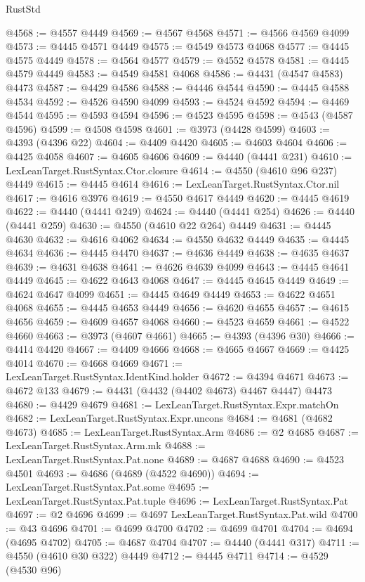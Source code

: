 \begin{lexlean}{RustStd}
\begin{coremodule}
@4568 := @4557 @4449
@4569 := @4567 @4568
@4571 := @4566 @4569 @4099
@4573 := @4445 @4571 @4449
@4575 := @4549 @4573 @4068
@4577 := @4445 @4575 @4449
@4578 := @4564 @4577
@4579 := @4552 @4578
@4581 := @4445 @4579 @4449
@4583 := @4549 @4581 @4068
@4586 := @4431 (@4547 @4583) @4473
@4587 := @4429 @4586
@4588 := @4446 @4544
@4590 := @4445 @4588 @4534
@4592 := @4526 @4590 @4099
@4593 := @4524 @4592
@4594 := @4469 @4544
@4595 := @4593 @4594
@4596 := @4523 @4595
@4598 := @4543 (@4587 @4596)
@4599 := @4508 @4598
@4601 := @3973 (@4428 @4599)
@4603 := @4393 (@4396 @22)
@4604 := @4409 @4420
@4605 := @4603 @4604
@4606 := @4425 @4058
@4607 := @4605 @4606
@4609 := @4440 (@4441 @231)
@4610 := LexLeanTarget.RustSyntax.Ctor.closure
@4614 := @4550 (@4610 @96 @237) @4449
@4615 := @4445 @4614
@4616 := LexLeanTarget.RustSyntax.Ctor.nil
@4617 := @4616 @3976
@4619 := @4550 @4617 @4449
@4620 := @4445 @4619
@4622 := @4440 (@4441 @249)
@4624 := @4440 (@4441 @254)
@4626 := @4440 (@4441 @259)
@4630 := @4550 (@4610 @22 @264) @4449
@4631 := @4445 @4630
@4632 := @4616 @4062
@4634 := @4550 @4632 @4449
@4635 := @4445 @4634
@4636 := @4445 @4470
@4637 := @4636 @4449
@4638 := @4635 @4637
@4639 := @4631 @4638
@4641 := @4626 @4639 @4099
@4643 := @4445 @4641 @4449
@4645 := @4622 @4643 @4068
@4647 := @4445 @4645 @4449
@4649 := @4624 @4647 @4099
@4651 := @4445 @4649 @4449
@4653 := @4622 @4651 @4068
@4655 := @4445 @4653 @4449
@4656 := @4620 @4655
@4657 := @4615 @4656
@4659 := @4609 @4657 @4068
@4660 := @4523 @4659
@4661 := @4522 @4660
@4663 := @3973 (@4607 @4661)
@4665 := @4393 (@4396 @30)
@4666 := @4414 @4420
@4667 := @4409 @4666
@4668 := @4665 @4667
@4669 := @4425 @4014
@4670 := @4668 @4669
@4671 := LexLeanTarget.RustSyntax.IdentKind.holder
@4672 := @4394 @4671
@4673 := @4672 @133
@4679 := @4431 (@4432 (@4402 @4673) @4467 @4447) @4473
@4680 := @4429 @4679
@4681 := LexLeanTarget.RustSyntax.Expr.matchOn
@4682 := LexLeanTarget.RustSyntax.Expr.uncons
@4684 := @4681 (@4682 @4673)
@4685 := LexLeanTarget.RustSyntax.Arm
@4686 := @2 @4685
@4687 := LexLeanTarget.RustSyntax.Arm.mk
@4688 := LexLeanTarget.RustSyntax.Pat.none
@4689 := @4687 @4688
@4690 := @4523 @4501
@4693 := @4686 (@4689 (@4522 @4690))
@4694 := LexLeanTarget.RustSyntax.Pat.some
@4695 := LexLeanTarget.RustSyntax.Pat.tuple
@4696 := LexLeanTarget.RustSyntax.Pat
@4697 := @2 @4696
@4699 := @4697 LexLeanTarget.RustSyntax.Pat.wild
@4700 := @43 @4696
@4701 := @4699 @4700
@4702 := @4699 @4701
@4704 := @4694 (@4695 @4702)
@4705 := @4687 @4704
@4707 := @4440 (@4441 @317)
@4711 := @4550 (@4610 @30 @322) @4449
@4712 := @4445 @4711
@4714 := @4529 (@4530 @96)

\end{coremodule}
\end{lexlean}

